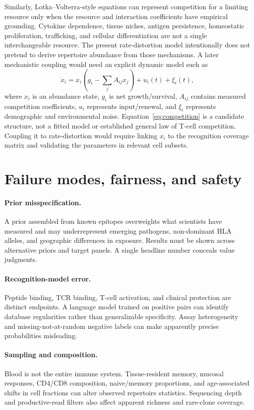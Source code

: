 \documentclass[11pt]{article}
\begin{document}
Similarly, Lotka--Volterra-style equations can represent competition for a limiting resource only when the resource and interaction coefficients have empirical grounding. Cytokine dependence, tissue niches, antigen persistence, homeostatic proliferation, trafficking, and cellular differentiation are not a single interchangeable resource. The present rate-distortion model intentionally does not pretend to derive repertoire abundance from those mechanisms. A later mechanistic coupling would need an explicit dynamic model such as
\begin{equation}
\dot{x}_i=x_i\left(g_i-\sum_j A_{ij}x_j\right)+u_i(t)+\xi_i(t),
\label{eq:competition}
\end{equation}
where $x_i$ is an abundance state, $g_i$ is net growth/survival, $A_{ij}$ contains measured competition coefficients, $u_i$ represents input/renewal, and $\xi_i$ represents demographic and environmental noise. Equation~\eqref{eq:competition} is a candidate structure, not a fitted model or established general law of T-cell competition. Coupling it to rate-distortion would require linking $x_i$ to the recognition coverage matrix and validating the parameters in relevant cell subsets.

\section{Failure modes, fairness, and safety}
\paragraph{Prior misspecification.} A prior assembled from known epitopes overweights what scientists have measured and may underrepresent emerging pathogens, non-dominant HLA alleles, and geographic differences in exposure. Results must be shown across alternative priors and target panels. A single headline number conceals value judgments.

\paragraph{Recognition-model error.} Peptide binding, TCR binding, T-cell activation, and clinical protection are distinct endpoints. A language model trained on positive pairs can identify database regularities rather than generalizable specificity. Assay heterogeneity and missing-not-at-random negative labels can make apparently precise probabilities misleading.

\paragraph{Sampling and composition.} Blood is not the entire immune system. Tissue-resident memory, mucosal responses, CD4/CD8 composition, naive/memory proportions, and age-associated shifts in cell fractions can alter observed repertoire statistics. Sequencing depth and productive-read filters also affect apparent richness and rare-clone coverage.
\end{document}
